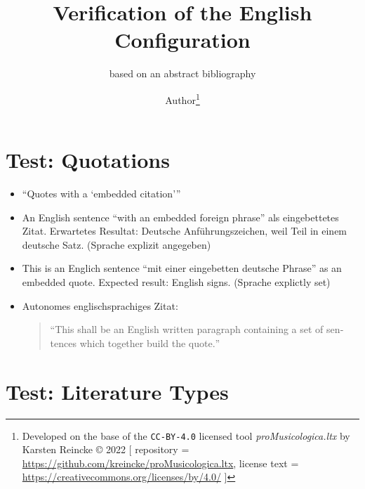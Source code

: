 \documentclass[
  DIV=calc,
  BCOR=5mm,
  11pt,
  headings=small,
  oneside,
  abstract=true,
  toc=bib,
  ngerman,english]{scrartcl}
\begin{document}
\nocite{*}

\titlehead{Bib\LaTeX}
\subject{Release 1.0}
\title{Verification of the English Configuration}
\subtitle{based on an abstract bibliography}
\author{Author\footnote{
Developed on the base of the \texttt{CC-BY-4.0} licensed tool \textit{proMusicologica.ltx} by Karsten Reincke \copyright{} 2022 [
repository = \href{https://github.com/kreincke/proMusicologica.ltx}{https://github.com/kreincke/proMusicologica.ltx},
license text = \href{https://creativecommons.org/licenses/by/4.0/}{https://creativecommons.org/licenses/by/4.0/} ]}
}


\maketitle

\footnotesize
\tableofcontents

\normalsize
\section{Test: Quotations}
\begin{itemize}

  \item \enquote{Quotes with a \enquote{embedded citation}}

  \item An English sentence \foreignquote{german}{with an embedded foreign phrase} als eingebettetes Zitat. Erwartetes Resultat: Deutsche Anführungszeichen, weil Teil in einem deutsche Satz. (Sprache explizit angegeben)

  \item This is an Englich sentence \foreignquote{english}{mit einer eingebetten deutsche Phrase} as an embedded quote. Expected result: English signs. (Sprache explictly set)

  \item Autonomes englischsprachiges Zitat:
  \begin{quote}\foreignquote{english}{This shall be an English written paragraph containing a set of sentences which together build the quote.}\end{quote}

\end{itemize}

\section{Test: Literature Types}
\end{document}
